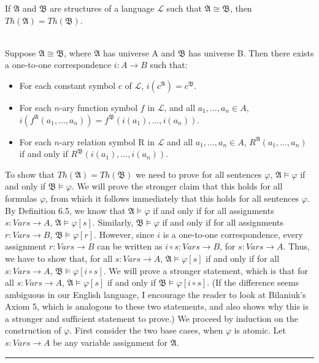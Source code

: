 \documentclass[11pt]{hmcpset}
\newenvironment{problem1}[1]{\noindent {\bf Problem #1}}
{\medskip}
\newenvironment{proof}{\noindent {\bf Proof:} \\}{\hfill
\rule{1mm}{3mm} \bigskip}
\begin{document}
\begin{problem1}{2. (a)} If $\mathfrak{A}$ and $\mathfrak{B}$ are structures of a language $\mathcal{L}$ such that $\mathfrak{A}\cong\mathfrak{B}$, then $Th(\mathfrak{A})=Th(\mathfrak{B})$.

\begin{proof}\indent Suppose $\mathfrak{A}\cong\mathfrak{B}$, where $\mathfrak{A}$ has universe A and $\mathfrak{B}$ has universe B. Then there exists a one-to-one correspondence $i:A\to B$ such that:
\begin{itemize}
\item{For each constant symbol $c $ of $ \mathcal{L}$, $i(c^{\mathfrak{A}})=c^{\mathfrak{B}}$.}
\item{For each $n$-ary function symbol $f$ in $\mathcal{L}$, and all $a_1,\ldots,a_n \in A$, $i(f^{\mathfrak{A}}(a_1,\ldots,a_n))=f^{\mathfrak{B}}(i(a_1),\ldots,i(a_n))$.}
\item{For each $n$-ary relation symbol R in $\mathcal{L}$ and all $a_1,\ldots,a_n \in A$, $R^{\mathfrak{A}}(a_1,\ldots,a_n)$ if and only if $R^{\mathfrak{B}}(i(a_1),\ldots,i(a_n)).$}
\end{itemize}
To show that $Th(\mathfrak{A})=Th(\mathfrak{B})$ we need to prove for all sentences $\varphi$, $\mathfrak{A}\vDash\varphi$ if and only if $\mathfrak{B}\vDash\varphi$. We will prove the stronger claim that this holds for all formulas $\varphi$, from which it follows immediately that this holds for all sentences $\varphi$.  By Definition 6.5, we know that $\mathfrak{A}\vDash\varphi$ if and only if for all assignments $s:Vars\to A$, $\mathfrak{A}\vDash\varphi [s]$. Similarly, $\mathfrak{B}\vDash\varphi$ if and only if for all assignments $r:Vars\to B$, $\mathfrak{B}\vDash\varphi [r]$. However, since $i$ is a one-to-one correspondence, every assignment $r:Vars\to B$ can be written as $i \circ s: Vars \to B$, for $s:Vars\to A$. Thus, we have to show that, for all $s:Vars\to A$, $\mathfrak{A}\vDash\varphi [s]$ if and only if for all $s:Vars\to A$, $\mathfrak{B}\vDash\varphi [i \circ s]$. We will prove a stronger statement, which is that for all $s:Vars\to A$, $\mathfrak{A}\vDash\varphi [s]$ if and only if $\mathfrak{B}\vDash\varphi [i \circ s]$. (If the difference seems ambiguous in our English language, I encourage the reader to look at Bilaniuk's Axiom 5, which is analogous to these two statements, and also shows why this is a stronger and sufficient statement to prove.) We proceed by induction on the construction of $\varphi$. First consider the two base cases, when $\varphi$ is atomic. Let $s:Vars\to A$ be any variable assignment for $\mathfrak{A}$. 


\end{proof}
\end{problem1}
\end{document}
